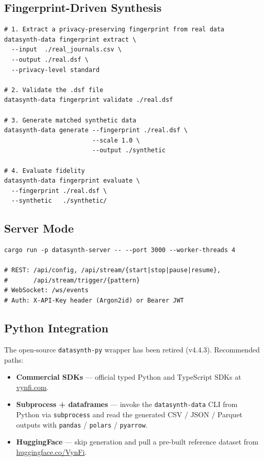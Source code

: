 \documentclass[11pt,a4paper]{article}
\begin{document}
\subsection{Fingerprint-Driven Synthesis}

\begin{tcolorbox}[notebox={From real data to defensible synthetic}]
\small
\begin{verbatim}
# 1. Extract a privacy-preserving fingerprint from real data
datasynth-data fingerprint extract \
  --input  ./real_journals.csv \
  --output ./real.dsf \
  --privacy-level standard

# 2. Validate the .dsf file
datasynth-data fingerprint validate ./real.dsf

# 3. Generate matched synthetic data
datasynth-data generate --fingerprint ./real.dsf \
                        --scale 1.0 \
                        --output ./synthetic

# 4. Evaluate fidelity
datasynth-data fingerprint evaluate \
  --fingerprint ./real.dsf \
  --synthetic   ./synthetic/
\end{verbatim}
\end{tcolorbox}

\subsection{Server Mode}

\begin{tcolorbox}[notebox={REST / gRPC / WebSocket}]
\small
\begin{verbatim}
cargo run -p datasynth-server -- --port 3000 --worker-threads 4

# REST: /api/config, /api/stream/{start|stop|pause|resume},
#       /api/stream/trigger/{pattern}
# WebSocket: /ws/events
# Auth: X-API-Key header (Argon2id) or Bearer JWT
\end{verbatim}
\end{tcolorbox}

\subsection{Python Integration}

The open-source \texttt{datasynth-py} wrapper has been retired (v4.4.3).
Recommended paths:

\begin{itemize}[leftmargin=1.2em, itemsep=3pt]
  \item \textbf{Commercial SDKs} --- official typed Python and TypeScript
        SDKs at \href{https://vynfi.com}{vynfi.com}.
  \item \textbf{Subprocess + dataframes} --- invoke the \texttt{datasynth-data}
        CLI from Python via \texttt{subprocess} and read the generated
        CSV / JSON / Parquet outputs with \texttt{pandas} / \texttt{polars}
        / \texttt{pyarrow}.
  \item \textbf{HuggingFace} --- skip generation and pull a pre-built
        reference dataset from \href{https://huggingface.co/VynFi}{huggingface.co/VynFi}.
\end{itemize}
\end{document}
